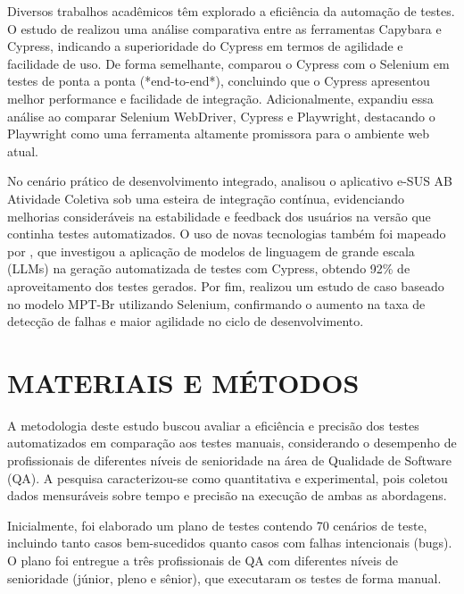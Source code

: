 \documentclass{UNESC}
\begin{document}
Diversos trabalhos acadêmicos têm explorado a eficiência da automação de testes. O estudo de  realizou uma análise comparativa entre as ferramentas Capybara e Cypress, indicando a superioridade do Cypress em termos de agilidade e facilidade de uso. De forma semelhante,  comparou o Cypress com o Selenium em testes de ponta a ponta (*end-to-end*), concluindo que o Cypress apresentou melhor performance e facilidade de integração. Adicionalmente,  expandiu essa análise ao comparar Selenium WebDriver, Cypress e Playwright, destacando o Playwright como uma ferramenta altamente promissora para o ambiente web atual.

No cenário prático de desenvolvimento integrado,  analisou o aplicativo e-SUS AB Atividade Coletiva sob uma esteira de integração contínua, evidenciando melhorias consideráveis na estabilidade e feedback dos usuários na versão que continha testes automatizados. O uso de novas tecnologias também foi mapeado por , que investigou a aplicação de modelos de linguagem de grande escala (LLMs) na geração automatizada de testes com Cypress, obtendo 92\% de aproveitamento dos testes gerados. Por fim,  realizou um estudo de caso baseado no modelo MPT-Br utilizando Selenium, confirmando o aumento na taxa de detecção de falhas e maior agilidade no ciclo de desenvolvimento.

\section{MATERIAIS E MÉTODOS}
A metodologia deste estudo buscou avaliar a eficiência e precisão dos testes automatizados em comparação aos testes manuais, considerando o desempenho de profissionais de diferentes níveis de senioridade na área de Qualidade de Software (QA). A pesquisa caracterizou-se como quantitativa e experimental, pois coletou dados mensuráveis sobre tempo e precisão na execução de ambas as abordagens.

Inicialmente, foi elaborado um plano de testes contendo 70 cenários de teste, incluindo tanto casos bem-sucedidos quanto casos com falhas intencionais (bugs). O plano foi entregue a três profissionais de QA com diferentes níveis de senioridade (júnior, pleno e sênior), que executaram os testes de forma manual. 
\end{document}
